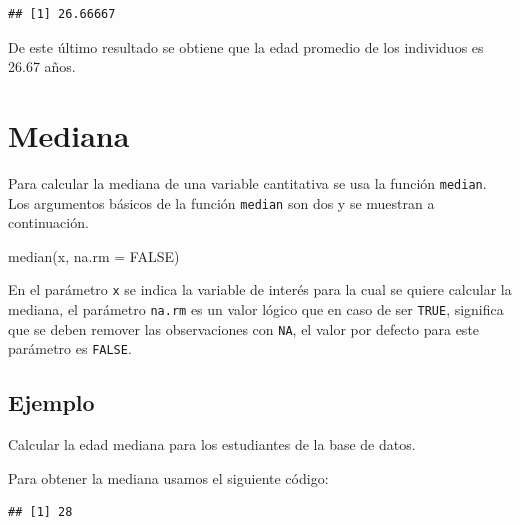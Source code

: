 \documentclass[
]{book}
\makeatletter
\newenvironment{Shaded}{\begin{snugshade}}{\end{snugshade}}
\newcommand{\AttributeTok}[1]{\textcolor[rgb]{0.77,0.63,0.00}{#1}}
\newcommand{\ConstantTok}[1]{\textcolor[rgb]{0.00,0.00,0.00}{#1}}
\newcommand{\FunctionTok}[1]{\textcolor[rgb]{0.00,0.00,0.00}{#1}}
\newcommand{\NormalTok}[1]{#1}
\newcommand{\SpecialCharTok}[1]{\textcolor[rgb]{0.00,0.00,0.00}{#1}}
\newenvironment{kframe}{%
\medskip{}
\setlength{\fboxsep}{.8em}
 \def\at@end@of@kframe{}%
 \ifinner\ifhmode%
  \def\at@end@of@kframe{\end{minipage}}%
  \begin{minipage}{\columnwidth}%
 \fi\fi%
 \def\FrameCommand##1{\hskip\@totalleftmargin \hskip-\fboxsep
 \colorbox{shadecolor}{##1}\hskip-\fboxsep
     \hskip-\linewidth \hskip-\@totalleftmargin \hskip\columnwidth}%
 \MakeFramed {\advance\hsize-\width
   \@totalleftmargin\z@ \linewidth\hsize
   \@setminipage}}%
 {\par\unskip\endMakeFramed%
 \at@end@of@kframe}
\renewenvironment{Shaded}{\begin{kframe}}{\end{kframe}}
\makeatother
\begin{document}
\begin{verbatim}
## [1] 26.66667
\end{verbatim}

De este último resultado se obtiene que la edad promedio de los individuos es 26.67 años.

\hypertarget{mediana}{%
\section{\texorpdfstring{Mediana  }{Mediana  }}\label{mediana}}

Para calcular la mediana de una variable cantitativa se usa la función \texttt{median}. Los argumentos básicos de la función \texttt{median} son dos y se muestran a continuación.

\begin{Shaded}
\begin{Highlighting}[]
\FunctionTok{median}\NormalTok{(x, }\AttributeTok{na.rm =} \ConstantTok{FALSE}\NormalTok{)}
\end{Highlighting}
\end{Shaded}

En el parámetro \texttt{x} se indica la variable de interés para la cual se quiere calcular la mediana, el parámetro \texttt{na.rm} es un valor lógico que en caso de ser \texttt{TRUE}, significa que se deben remover las observaciones con \texttt{NA}, el valor por defecto para este parámetro es \texttt{FALSE}.

\hypertarget{ejemplo-33}{%
\subsection*{Ejemplo}\label{ejemplo-33}}

Calcular la edad mediana para los estudiantes de la base de datos.

Para obtener la mediana usamos el siguiente código:

\begin{Shaded}
\end{Shaded}

\begin{verbatim}
## [1] 28
\end{verbatim}
\end{document}
